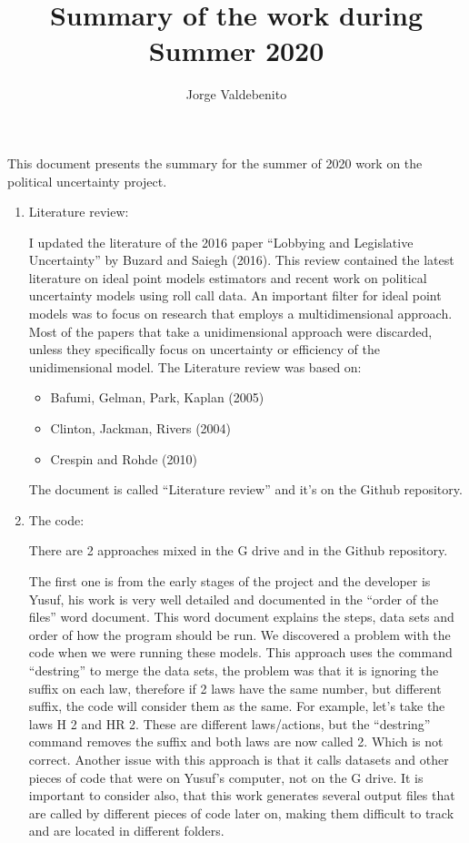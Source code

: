 \documentclass[a4paper,12pt]{article}
\begin{document}
\title{\vspace{-1.5 cm}Summary of the work during Summer 2020}
\author{Jorge Valdebenito}
\maketitle

\noindent This document presents the summary for the summer of 2020 work on the political uncertainty project. 
\begin{enumerate}
\item Literature review:

I updated the literature of the 2016 paper “Lobbying and Legislative Uncertainty” by Buzard and Saiegh (2016). This review contained the latest literature on ideal point models estimators and recent work on political uncertainty models using roll call data. An important filter for ideal point models was to focus on research that employs a multidimensional approach. Most of the papers that take a unidimensional approach were discarded, unless they specifically focus on uncertainty or efficiency of the unidimensional model.
The Literature review was based on:

\begin{itemize}
\item Bafumi, Gelman, Park, Kaplan (2005) 
\item Clinton, Jackman, Rivers (2004)
\item Crespin and Rohde (2010)
\end{itemize}
The document is called “Literature review” and it’s on the Github repository.



\item The code:

There are 2 approaches mixed in the G drive and in the Github repository. 

The first one is from the early stages of the project and the developer is Yusuf, his work is very well detailed and documented in the “order of the files” word document. This word document explains the steps, data sets and order of how the program should be run. We discovered a problem with the code when we were running these models. This approach uses the command “destring” to merge the data sets, the problem was that it is ignoring the suffix on each law, therefore if 2 laws have the same number, but different suffix, the code will consider them as the same. 
For example, let’s take the laws H 2 and HR 2. These are different laws/actions, but the “destring” command removes the suffix and both laws are now called 2. Which is not correct. 
Another issue with this approach is that it calls datasets and other pieces of code that were on Yusuf’s computer, not on the G drive. It is important to consider also, that this work generates several output files that are called by different pieces of code later on, making them difficult to track and are located in different folders. 


\end{enumerate}
\end{document}
